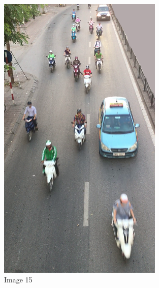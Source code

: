 \begin{center}
    \begin{figure}[H]
        \centering
      \includegraphics[width=0.7\textwidth]{Chapters/Fig/15}
      \caption{Image 15}
      \label{fig:img15}
  \end{figure}
\end{center}